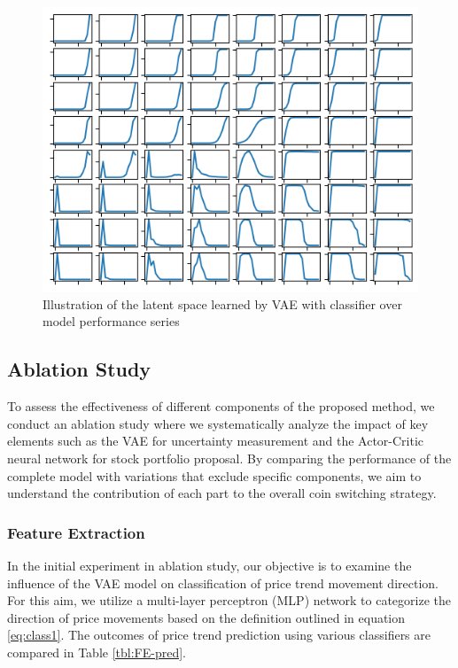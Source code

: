 \begin{figure}[h]
	\centering
	\includegraphics[scale=0.8]{./model_latent_space.png}
	\caption{Illustration of the latent space learned by VAE with classifier over model performance series}
	\label{fig:latent_full}
\end{figure}


\subsection{Ablation Study}

To assess the effectiveness of different components of the proposed method, we conduct an ablation study where we systematically analyze the impact of key elements such as the VAE for uncertainty measurement and the Actor-Critic neural network for stock portfolio proposal. By comparing the performance of the complete model with variations that exclude specific components, we aim to understand the contribution of each part to the overall coin switching strategy.

\subsubsection{Feature Extraction}
In the initial experiment in ablation study, our objective is to examine the influence of the VAE model on classification of price trend movement direction. For this aim, we utilize a multi-layer perceptron (MLP) network to categorize the direction of price movements based on the definition outlined in equation \eqref{eq:class1}. The outcomes of price trend prediction using various classifiers are compared in Table \ref{tbl:FE-pred}.

